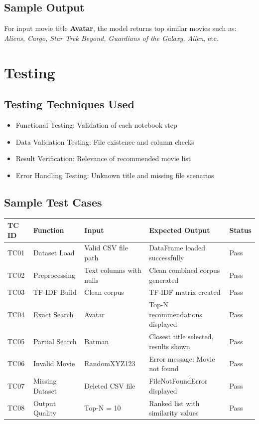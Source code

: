 \documentclass[12pt,a4paper]{report}
\begin{document}
\section{Sample Output}
For input movie title \textbf{Avatar}, the model returns top similar movies such as:
\textit{Aliens, Cargo, Star Trek Beyond, Guardians of the Galaxy, Alien}, etc.

\chapter{Testing}

\section{Testing Techniques Used}
\begin{itemize}[leftmargin=1.2cm]
\item Functional Testing: Validation of each notebook step
\item Data Validation Testing: File existence and column checks
\item Result Verification: Relevance of recommended movie list
\item Error Handling Testing: Unknown title and missing file scenarios
\end{itemize}

\section{Sample Test Cases}
\begin{table}[H]
\centering
\begin{tabular}{p{1.7cm}p{3.6cm}p{3.2cm}p{4.0cm}p{1.8cm}}
\toprule
\textbf{TC ID} & \textbf{Function} & \textbf{Input} & \textbf{Expected Output} & \textbf{Status} \\
\midrule
TC01 & Dataset Load & Valid CSV file path & DataFrame loaded successfully & Pass \\
TC02 & Preprocessing & Text columns with nulls & Clean combined corpus generated & Pass \\
TC03 & TF-IDF Build & Clean corpus & TF-IDF matrix created & Pass \\
TC04 & Exact Search & Avatar & Top-N recommendations displayed & Pass \\
TC05 & Partial Search & Batman & Closest title selected, results shown & Pass \\
TC06 & Invalid Movie & RandomXYZ123 & Error message: Movie not found & Pass \\
TC07 & Missing Dataset & Deleted CSV file & FileNotFoundError displayed & Pass \\
TC08 & Output Quality & Top-N = 10 & Ranked list with similarity values & Pass \\
\bottomrule
\end{tabular}
\end{table}
\end{document}
